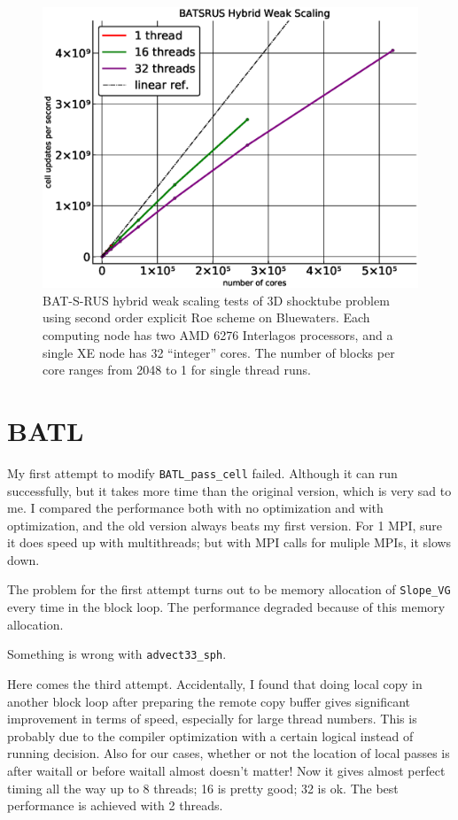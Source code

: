 \documentclass[11pt]{book} %
\begin{document}
\begin{figure}[h]
    \centering
    \includegraphics[width=\textwidth]{./figures/WeakScale_linear}
    \caption{BAT-S-RUS hybrid weak scaling tests of 3D shocktube problem using second order explicit Roe scheme on Bluewaters. Each computing node has two AMD 6276 Interlagos processors, and a single XE node has 32 ``integer'' cores. The number of blocks per core ranges from 2048 to 1 for single thread runs.}
    \label{fig:WeakScale}
\end{figure}

\section{BATL}

My first attempt to modify \verb|BATL_pass_cell| failed. Although it can run successfully, but it takes more time than the original version, which is very sad to me. I compared the performance both with no optimization and with optimization, and the old version always beats my first version. For 1 MPI, sure it does speed up with multithreads; but with MPI calls for muliple MPIs, it slows down.

The problem for the first attempt turns out to be memory allocation of \verb|Slope_VG| every time in the block loop. The performance degraded because of this memory allocation.

Something is wrong with \verb|advect33_sph|. 

Here comes the third attempt. Accidentally, I found that doing local copy in another block loop after preparing the remote copy buffer gives significant improvement in terms of speed, especially for large thread numbers. This is probably due to the compiler optimization with a certain logical instead of running decision. Also for our cases, whether or not the location of local passes is after waitall or before waitall almost doesn't matter! Now it gives almost perfect timing all the way up to 8 threads; 16 is pretty good; 32 is ok. The best performance is achieved with 2 threads.
\end{document}
